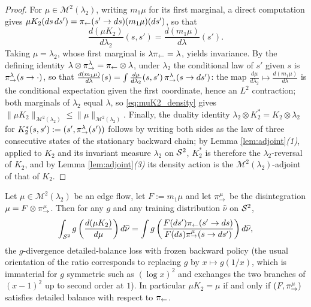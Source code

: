 \begin{proof}
For $\mu\in\mathcal M^2(\lambda_2)$, writing $m_1\mu$ for its first marginal, a direct computation gives $\mu K_2(ds\,ds') = \pi_{\leftarrow}(s'\rightarrow ds)(m_1\mu)(ds')$, so that
\begin{equation}\label{eq:muK2_density}
    \frac{d(\mu K_2)}{d\lambda_2}(s,s') = \frac{d(m_1\mu)}{d\lambda}(s').
\end{equation}
Taking $\mu=\lambda_2$, whose first marginal is $\lambda\pi_{\leftarrow}=\lambda$, yields invariance. By the defining identity $\lambda\otimes\pi_{\rightarrow}^\lambda = \pi_{\leftarrow}\otimes\lambda$, under $\lambda_2$ the conditional law of $s'$ given $s$ is $\pi_{\rightarrow}^\lambda(s\rightarrow\cdot)$, so that $\frac{d(m_1\mu)}{d\lambda}(s) = \int\frac{d\mu}{d\lambda_2}(s,s')\,\pi_{\rightarrow}^\lambda(s\rightarrow ds')$: the map $\frac{d\mu}{d\lambda_2}\mapsto \frac{d(m_1\mu)}{d\lambda}$ is the conditional expectation given the first coordinate, hence an $L^2$ contraction; both marginals of $\lambda_2$ equal $\lambda$, so \eqref{eq:muK2_density} gives $\|\mu K_2\|_{\mathcal M^2(\lambda_2)}\leq \|\mu\|_{\mathcal M^2(\lambda_2)}$. Finally, the duality identity $\lambda_2\otimes K_2^* = K_2 \otimes \lambda_2$ for $K_2^*(s,s') := (s',\pi_{\rightarrow}^\lambda(s'))$ follows by writing both sides as the law of three consecutive states of the stationary backward chain; by Lemma \ref{lem:adjoint}\emph{(1)}, applied to $K_2$ and its invariant measure $\lambda_2$ on $\mathcal S^2$, $K_2^*$ is therefore the $\lambda_2$-reversal of $K_2$, and by Lemma \ref{lem:adjoint}\emph{(3)} its density action is the $\mathcal M^2(\lambda_2)$-adjoint of that of $K_2$.
\end{proof}

\begin{proposition}\label{prop:db_lift}
Let $\mu\in \mathcal M^2(\lambda_2)$ be an edge flow, let $F:=m_1\mu$ and let $\pi_{\rightarrow}^\mu$ be the disintegration $\mu = F\otimes \pi_{\rightarrow}^\mu$. Then for any $g$ and any training distribution $\widehat\nu$ on $\mathcal S^2$,
\begin{equation}
    \int_{\mathcal S^2} g\left(\frac{d(\mu K_2)}{d\mu}\right)d\widehat\nu
    = \int g\left(\frac{F(ds')\pi_{\leftarrow}(s'\rightarrow ds)}{F(ds)\pi_{\rightarrow}^\mu(s\rightarrow ds')}\right)d\widehat\nu,
\end{equation}
the $g$-divergence detailed-balance loss with frozen backward policy (the usual orientation of the ratio corresponds to replacing $g$ by $x \mapsto g(1/x)$, which is immaterial for $g$ symmetric such as $(\log x)^2$ and exchanges the two branches of $(x-1)^2$ up to second order at $1$). In particular $\mu K_2=\mu$ if and only if $(F,\pi_{\rightarrow}^\mu)$ satisfies detailed balance with respect to $\pi_{\leftarrow}$.
\end{proposition}

